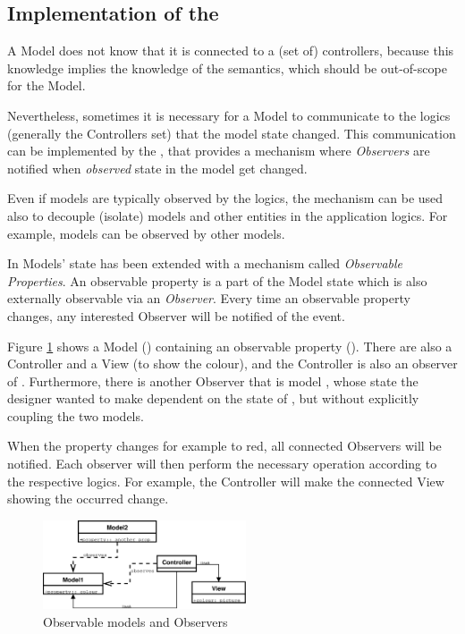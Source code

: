 \subsection{\label{OBS} Implementation of the \obs}

A Model does not know that it is connected to a (set of) controllers,
because this knowledge implies the knowledge of the \gui semantics,
which should be out-of-scope for the Model.

Nevertheless, sometimes it is necessary for a Model to communicate to
the \gui logics (generally the Controllers set) that the model state
changed. This communication can be implemented by the \obs, that
provides a mechanism where \emph{Observers} are notified when
\emph{observed} state in the model get changed.

Even if models are typically observed by the \gui logics, the
mechanism can be used also to decouple (isolate) models and other
entities in the application logics. For example, models can be
observed by other models.

In \pygtkmvc Models' state has been extended with a mechanism called
\emph{Observable Properties}. An observable property is a part of the
Model state which is also externally observable via an
\emph{Observer}. Every time an observable property changes, any
interested Observer will be notified of the event.

Figure \ref{F:OBS} shows a Model () containing an
observable property (). There are also a Controller and a
View (to show the colour), and the Controller is also an observer of
. Furthermore, there is another Observer that is model 
, whose state the designer wanted to make dependent on the
state of , but without explicitly coupling the two models.

When the property  changes for example to red, all connected
Observers will be notified. Each observer will then perform the
necessary operation according to the respective logics. For example,
the Controller will make the connected View showing the occurred
change.

\begin{figure}[htbp]
\begin{center}
\includegraphics[width=6cm]{eps/obs.eps}
\caption{\label{F:OBS}Observable models and Observers}
\end{center}
\end{figure}

